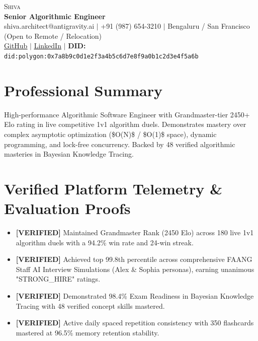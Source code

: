 \documentclass[letterpaper,10pt]{article}
\begin{document}
\begin{center}
    {\Huge \scshape Shiva} \\ \vspace{2pt}
    {\large \textbf{Senior Algorithmic Engineer}} \\ \vspace{2pt}
    \small shiva.architect@antigravity.ai $|$ +91 (987) 654-3210 $|$ Bengaluru / San Francisco (Open to Remote / Relocation) \\
    \href{https://github.com/Pritamchaurasiya/Learning\_Hub}{\underline{GitHub}} $|$
    \href{https://linkedin.com/in/shiva-ai-architect}{\underline{LinkedIn}} $|$
    \textbf{DID:} \texttt{did:polygon:0x7a8b9c0d1e2f3a4b5c6d7e8f9a0b1c2d3e4f5a6b}
\end{center}

\section{Professional Summary}
\small{High-performance Algorithmic Software Engineer with Grandmaster-tier 2450+ Elo rating in live competitive 1v1 algorithm duels. Demonstrates mastery over complex asymptotic optimization (\$O(N)\$ / \$O(1)\$ space), dynamic programming, and lock-free concurrency. Backed by 48 verified algorithmic masteries in Bayesian Knowledge Tracing.}

\section{Verified Platform Telemetry \& Evaluation Proofs}
\begin{itemize}[leftmargin=0.15in, label={\tiny$\blacksquare$}]
  \item \small{\textbf{[VERIFIED]} Maintained Grandmaster Rank (2450 Elo) across 180 live 1v1 algorithm duels with a 94.2\% win rate and 24-win streak.}
  \item \small{\textbf{[VERIFIED]} Achieved top 99.8th percentile across comprehensive FAANG Staff AI Interview Simulations (Alex \& Sophia personas), earning unanimous "STRONG\_HIRE" ratings.}
  \item \small{\textbf{[VERIFIED]} Demonstrated 98.4\% Exam Readiness in Bayesian Knowledge Tracing with 48 verified concept skills mastered.}
  \item \small{\textbf{[VERIFIED]} Active daily spaced repetition consistency with 350 flashcards mastered at 96.5\% memory retention stability.}
\end{itemize}
\end{document}
